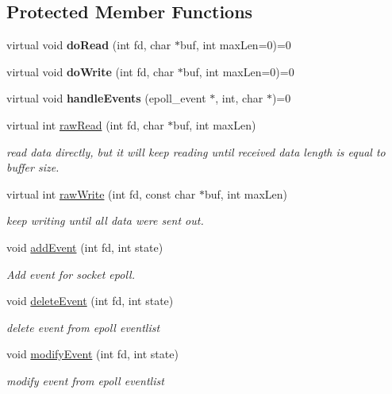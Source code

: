 \subsection*{Protected Member Functions}
\begin{DoxyCompactItemize}
\item 
\hypertarget{class_vix_mnt_socket_acf68d482f200c9f366807130d150a639}{}\label{class_vix_mnt_socket_acf68d482f200c9f366807130d150a639} 
virtual void {\bfseries do\+Read} (int fd, char $\ast$buf, int max\+Len=0)=0
\item 
\hypertarget{class_vix_mnt_socket_a987dea28d58eee116128eba14bb1c1a9}{}\label{class_vix_mnt_socket_a987dea28d58eee116128eba14bb1c1a9} 
virtual void {\bfseries do\+Write} (int fd, char $\ast$buf, int max\+Len=0)=0
\item 
\hypertarget{class_vix_mnt_socket_abf868d22e906ee3025f9f8b2b84dad92}{}\label{class_vix_mnt_socket_abf868d22e906ee3025f9f8b2b84dad92} 
virtual void {\bfseries handle\+Events} (epoll\+\_\+event $\ast$, int, char $\ast$)=0
\item 
virtual int \hyperlink{class_vix_mnt_socket_aad48ed0239fc3fb9e822cc13e6fefa97}{raw\+Read} (int fd, char $\ast$buf, int max\+Len)
\begin{DoxyCompactList}\small\item\em read data directly, but it will keep reading until received data length is equal to buffer size. \end{DoxyCompactList}\item 
virtual int \hyperlink{class_vix_mnt_socket_a08d845463648d0978024817fdda8b7e9}{raw\+Write} (int fd, const char $\ast$buf, int max\+Len)
\begin{DoxyCompactList}\small\item\em keep writing until all data were sent out. \end{DoxyCompactList}\item 
void \hyperlink{class_vix_mnt_socket_a6489a8065654dc69cca7dd71348211af}{add\+Event} (int fd, int state)
\begin{DoxyCompactList}\small\item\em Add event for socket epoll. \end{DoxyCompactList}\item 
void \hyperlink{class_vix_mnt_socket_a08b1d3d1dbf17ef8d2a20dc1bcfd2596}{delete\+Event} (int fd, int state)
\begin{DoxyCompactList}\small\item\em delete event from epoll eventlist \end{DoxyCompactList}\item 
void \hyperlink{class_vix_mnt_socket_a1c480a5b37f5938480781d40f00ce386}{modify\+Event} (int fd, int state)
\begin{DoxyCompactList}\small\item\em modify event from epoll eventlist \end{DoxyCompactList}\end{DoxyCompactItemize}
